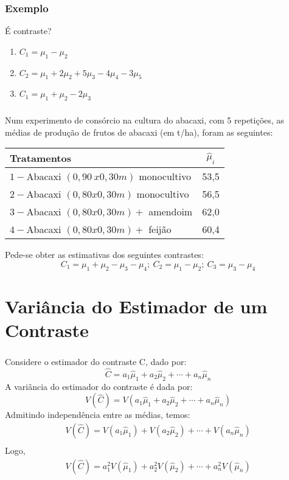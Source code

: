 \documentclass[14pt,aspectratio=1610]{beamer}
\begin{document}
\begin{frame}{}
\frametitle{Exemplo}
\begin{block}{}
\justifying
 É contraste?
 \begin{enumerate}
 \item $C_{1}=\mu_{1}-\mu_{2}$ \pause
 \item $C_{2}=\mu_{1}+2\mu_{2}+5\mu_{3}-4\mu_{4}-3\mu_{5}$ \pause
 \item $C_{1}=\mu_{1}+\mu_{2}-2\mu_{3}$
 \end{enumerate}
\end{block}
\end{frame}

\begin{frame}{}
\frametitle{}
\begin{block}{}
Num experimento de consórcio na cultura do abacaxi, com 5 repetições, as médias de
produção de frutos de abacaxi (em t/ha), foram as seguintes:
\begin{table}[]
\begin{tabular}{lc}
\hline
Tratamentos&$\hat{\mu}_{i}$\\
\hline
$1 - $Abacaxi $(0,90\ x 0,30m)$ monocultivo& 53,5\\
$2 - $Abacaxi $(0,80 x 0,30m)$ monocultivo& 56,5\\
$3 - $Abacaxi $(0,80 x 0,30m) +$ amendoim & 62,0\\
$4 - $Abacaxi $(0,80 x 0,30m) +$ feijão   & 60,4\\
\hline
\end{tabular}
\end{table}
Pede-se obter as estimativas dos seguintes contrastes:
$$C_{1}=\mu_{1}+\mu_{2}-\mu_{3}-\mu_{4};\ C_{2}=\mu_{1}-\mu_{2};\ C_{3}=\mu_{3}-\mu_{4}$$
\end{block}
\end{frame}

\section{Variância do Estimador de um Contraste}
\begin{frame}{}
\frametitle{}
\begin{block}{}
Considere o estimador do contraste C, dado por:
$$\hat{C}=a_{1}\hat{\mu}_{1}+a_{2}\hat{\mu}_{2}+\cdots+a_{n}\hat{\mu}_{n}$$
A variância do estimador do contraste é dada por:
$$V(\hat{C})=V(a_{1}\hat{\mu}_{1}+a_{2}\hat{\mu}_{2}+\cdots+a_{n}\hat{\mu}_{n})$$
Admitindo independência entre as médias, temos:
\begin{align*}
V(\hat{C})=V(a_{1}\hat{\mu}_{1})+V(a_{2}\hat{\mu}_{2})+\cdots+V(a_{n}\hat{\mu}_{n})\\
\end{align*}
Logo,
\begin{align*}
V(\hat{C})=a_{1}^{2}V(\hat{\mu}_{1})+a_{2}^{2}V(\hat{\mu}_{2})+\cdots+a_{n}^{2}V(\hat{\mu}_{n})
\end{align*}
\end{block}
\end{frame}
\end{document}
